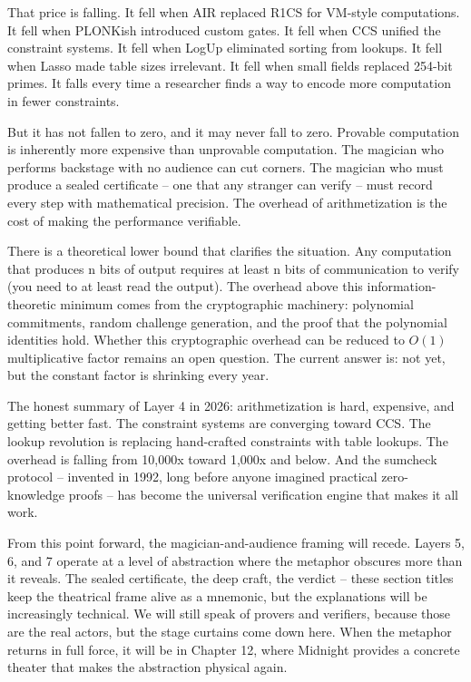 \documentclass[
  11pt,
  openany]{report}
\begin{document}
That price is falling. It fell when AIR replaced R1CS for VM-style computations.
It fell when PLONKish introduced custom gates. It fell when CCS unified the
constraint systems. It fell when LogUp eliminated sorting from lookups. It fell
when Lasso made table sizes irrelevant. It fell when small fields replaced
254-bit primes. It falls every time a researcher finds a way to encode more
computation in fewer constraints.

But it has not fallen to zero, and it may never fall to zero. Provable
computation is inherently more expensive than unprovable computation. The
magician who performs backstage with no audience can cut corners. The magician
who must produce a sealed certificate -- one that any stranger can verify --
must record every step with mathematical precision. The overhead of
arithmetization is the cost of making the performance verifiable.

There is a theoretical lower bound that clarifies the situation. Any computation
that produces n bits of output requires at least n bits of communication to
verify (you need to at least read the output). The overhead above this
information-theoretic minimum comes from the cryptographic machinery: polynomial
commitments, random challenge generation, and the proof that the polynomial
identities hold. Whether this cryptographic overhead can be reduced to \(O(1)\)
multiplicative factor remains an open question. The current answer is: not yet,
but the constant factor is shrinking every year.

The honest summary of Layer 4 in 2026: arithmetization is hard, expensive, and
getting better fast. The constraint systems are converging toward CCS. The
lookup revolution is replacing hand-crafted constraints with table lookups. The
overhead is falling from 10,000x toward 1,000x and below. And the sumcheck
protocol -- invented in 1992, long before anyone imagined practical
zero-knowledge proofs -- has become the universal verification engine that makes
it all work.

From this point forward, the magician-and-audience framing will recede. Layers
5, 6, and 7 operate at a level of abstraction where the metaphor obscures more
than it reveals. The sealed certificate, the deep craft, the verdict -- these
section titles keep the theatrical frame alive as a mnemonic, but the
explanations will be increasingly technical. We will still speak of provers and
verifiers, because those are the real actors, but the stage curtains come down
here. When the metaphor returns in full force, it will be in Chapter 12, where
Midnight provides a concrete theater that makes the abstraction physical again.
\end{document}

